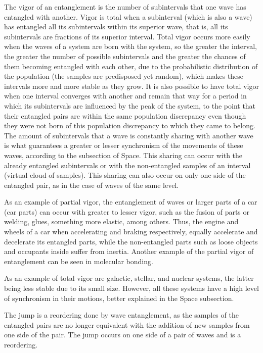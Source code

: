 The vigor of an entanglement is the number of subintervals that one wave has entangled with another. Vigor is total when a subinterval (which is also a wave) has entangled all its subintervals within its superior wave, that is, all its subintervals are fractions of its superior interval. Total vigor occurs more easily when the waves of a system are born with the system, so the greater the interval, the greater the number of possible subintervals and the greater the chances of them becoming entangled with each other, due to the probabilistic distribution of the population (the samples are predisposed yet random), which makes these intervals more and more stable as they grow. It is also possible to have total vigor when one interval converges with another and remain that way for a period in which its subintervals are influenced by the peak of the system, to the point that their entangled pairs are within the same population discrepancy even though they were not born of this population discrepancy to which they came to belong. The amount of subintervals that a wave is constantly sharing with another wave is what guarantees a greater or lesser synchronism of the movements of these waves, according to the subsection of Space. This sharing can occur with the already entangled subintervals or with the non-entangled samples of an interval (virtual cloud of samples). This sharing can also occur on only one side of the entangled pair, as in the case of waves of the same level.

As an example of partial vigor, the entanglement of waves or larger parts of a car (car parts) can occur with greater to lesser vigor, such as the fusion of parts or welding, glues, something more elastic, among others. Thus, the engine and wheels of a car when accelerating and braking respectively, equally accelerate and decelerate its entangled parts, while the non-entangled parts such as loose objects and occupants inside suffer from inertia. Another example of the partial vigor of entanglement can be seen in molecular bonding.

As an example of total vigor are galactic, stellar, and nuclear systems, the latter being less stable due to its small size. However, all these systems have a high level of synchronism in their motions, better explained in the Space subsection.

The jump is a reordering done by wave entanglement, as the samples of the entangled pairs are no longer equivalent with the addition of new samples from one side of the pair. The jump occurs on one side of a pair of waves and is a reordering.


